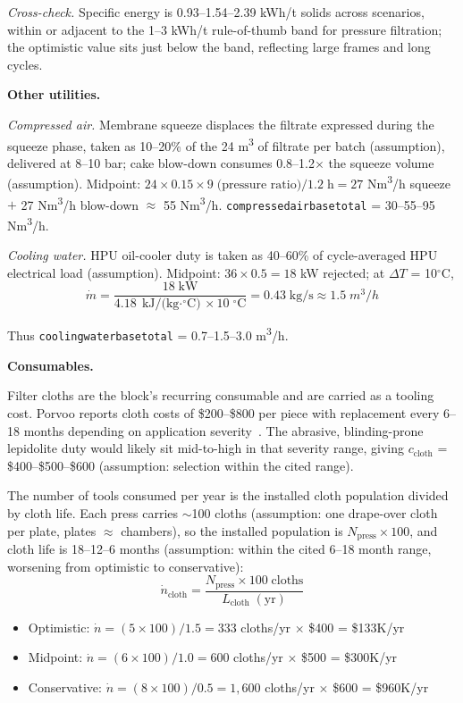 \documentclass{article}
\renewcommand\_{\textunderscore\allowbreak}
\begin{document}
\noindent \textit{Cross-check.} Specific energy is 0.93--1.54--2.39 kWh/t solids across scenarios, within or adjacent to the 1--3 kWh/t rule-of-thumb band for pressure filtration; the optimistic value sits just below the band, reflecting large frames and long cycles.

\medskip
\noindent\textbf{Other utilities.}\quad

\textit{Compressed air.} Membrane squeeze displaces the filtrate expressed during the squeeze phase, taken as 10--20\% of the 24 \si{m^3} of filtrate per batch (assumption), delivered at 8--10 bar; cake blow-down consumes 0.8--1.2$\times$ the squeeze volume (assumption). Midpoint: $24 \times 0.15 \times 9\;\text{(pressure ratio)} / 1.2\;\text{h} = 27$ \si{Nm^3/h} squeeze $+$ 27 \si{Nm^3/h} blow-down $\approx$ 55 \si{Nm^3/h}. \texttt{compressed\_air\_base\_total} = 30--55--95 \si{Nm^3/h}. 

\textit{Cooling water.} HPU oil-cooler duty is taken as 40--60\% of cycle-averaged HPU electrical load (assumption). Midpoint: $36 \times 0.5 = 18$ kW rejected; at $\Delta T$ = 10$^\circ$C,
\[
	\dot{m} = \frac{18\;\text{kW}}{4.18\;\text{kJ/(kg$\cdot^\circ$C)} \times 10\;^\circ\text{C}} = 0.43\;\text{kg/s} \approx 1.5\;\si{m^3/h}
\]

Thus  \texttt{cooling\_water\_base\_total} = 0.7--1.5--3.0 \si{m^3/h}.

\medskip
\noindent\textbf{Consumables.}\quad

Filter cloths are the block's recurring consumable and are carried as a tooling cost. Porvoo reports cloth costs of \$200--\$800 per piece with replacement every 6--18 months depending on application severity~\citep{porvooIndustrialFilterPress2025}. The abrasive, blinding-prone lepidolite duty would likely sit mid-to-high in that severity range, giving $c_\text{cloth}$ = \$400--\$500--\$600 (assumption: selection within the cited range).
 
The number of tools consumed per year is the installed cloth population divided by cloth life. Each press carries $\sim$100 cloths (assumption: one drape-over cloth per plate, plates $\approx$ chambers), so the installed population is $N_\text{press} \times 100$, and cloth life is 18--12--6 months (assumption: within the cited 6--18 month range, worsening from optimistic to conservative):
\[
	\dot{n}_\text{cloth} = \frac{N_\text{press} \times 100\;\text{cloths}}{L_\text{cloth}\;(\text{yr})}
\]
 
\begin{itemize}[noitemsep]
	\item Optimistic: $\dot{n} = (5 \times 100)/1.5 = 333$ cloths/yr $\times$ \$400 = \$133K/yr
	\item Midpoint: $\dot{n} = (6 \times 100)/1.0 = 600$ cloths/yr $\times$ \$500 = \$300K/yr
	\item Conservative: $\dot{n} = (8 \times 100)/0.5 = 1,600$ cloths/yr $\times$ \$600 = \$960K/yr
\end{itemize}
 
\end{document}
